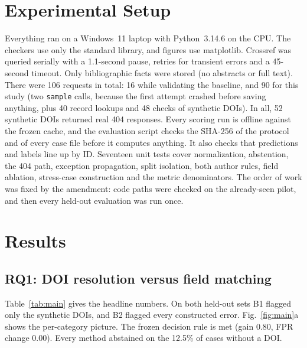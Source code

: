 \documentclass[acmsmall,screen,nonacm]{acmart}
\newcommand{\BOne}{B1}
\newcommand{\BTwo}{B2}
\begin{document}
\section{Experimental Setup}
Everything ran on a Windows~11 laptop with Python~3.14.6 on the CPU. The checkers use only the standard library, and figures use matplotlib. Crossref was queried serially with a 1.1-second pause, retries for transient errors and a 45-second timeout. Only bibliographic facts were stored (no abstracts or full text). There were 106 requests in total: 16 while validating the baseline, and 90 for this study (two \texttt{sample} calls, because the first attempt crashed before saving anything, plus 40 record lookups and 48 checks of synthetic DOIs). In all, 52 synthetic DOIs returned real 404 responses. Every scoring run is offline against the frozen cache, and the evaluation script checks the SHA-256 of the protocol and of every case file before it computes anything. It also checks that predictions and labels line up by ID. Seventeen unit tests cover normalization, abstention, the 404 path, exception propagation, split isolation, both author rules, field ablation, stress-case construction and the metric denominators. The order of work was fixed by the amendment: code paths were checked on the already-seen pilot, and then every held-out evaluation was run once.

\section{Results}
\subsection{RQ1: DOI resolution versus field matching}
Table~\ref{tab:main} gives the headline numbers. On both held-out sets \BOne{} flagged only the synthetic DOIs, and \BTwo{} flagged every constructed error. Fig.~\ref{fig:main}a shows the per-category picture. The frozen decision rule is met (gain 0.80, FPR change 0.00). Every method abstained on the 12.5\% of cases without a DOI.
\end{document}
